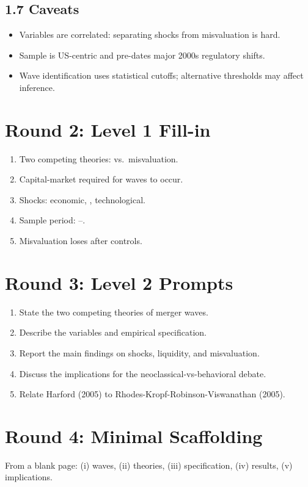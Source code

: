 \documentclass[11pt]{article}
\newcommand{\blank}[1]{\underline{\hspace{#1}}}
\begin{document}
\subsection*{1.7 Caveats}
\begin{alertbox}
\begin{itemize}
\item Variables are correlated: separating shocks from misvaluation is hard.
\item Sample is US-centric and pre-dates major 2000s regulatory shifts.
\item Wave identification uses statistical cutoffs; alternative thresholds may affect inference.
\end{itemize}
\end{alertbox}

\section*{Round 2: Level 1 Fill-in}
\begin{enumerate}
\item Two competing theories: \blank{2cm} vs.\ misvaluation.
\item Capital-market \blank{2cm} required for waves to occur.
\item Shocks: economic, \blank{2cm}, technological.
\item Sample period: \blank{1cm}--\blank{1cm}.
\item Misvaluation loses \blank{2cm} after controls.
\end{enumerate}

\section*{Round 3: Level 2 Prompts}
\begin{enumerate}
\item State the two competing theories of merger waves.
\item Describe the variables and empirical specification.
\item Report the main findings on shocks, liquidity, and misvaluation.
\item Discuss the implications for the neoclassical-vs-behavioral debate.
\item Relate Harford (2005) to Rhodes-Kropf-Robinson-Viswanathan (2005).
\end{enumerate}

\section*{Round 4: Minimal Scaffolding}
From a blank page: (i) waves, (ii) theories, (iii) specification, (iv) results, (v) implications.
\end{document}
